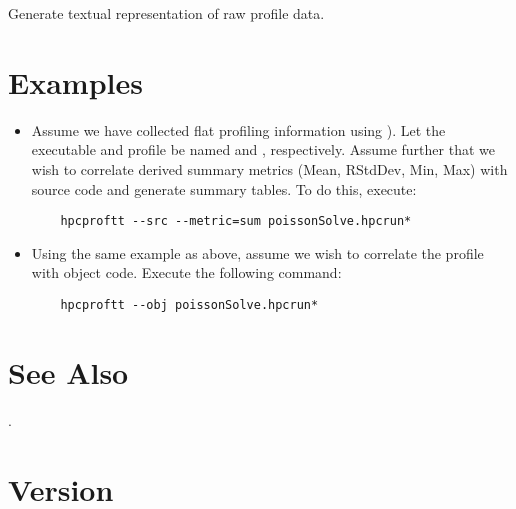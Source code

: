 \documentclass[english]{article}
\begin{document}
\begin{Description}
\item[\Opt{--dump}] Generate textual representation of raw profile data.
\end{Description}


\section{Examples}

\begin{itemize}

\item Assume we have collected flat profiling information using ).
Let the executable and profile be named  and , respectively.
Assume further that we wish to correlate derived summary metrics (Mean, RStdDev, Min, Max) with source code and generate summary tables.
To do this, execute:
\begin{verbatim}
    hpcproftt --src --metric=sum poissonSolve.hpcrun*
\end{verbatim}

\item Using the same example as above, assume we wish to correlate the profile with object code.  Execute the following command:
\begin{verbatim}
    hpcproftt --obj poissonSolve.hpcrun*
\end{verbatim}

\end{itemize}


\section{See Also}

.

\section{Version}
\end{document}
